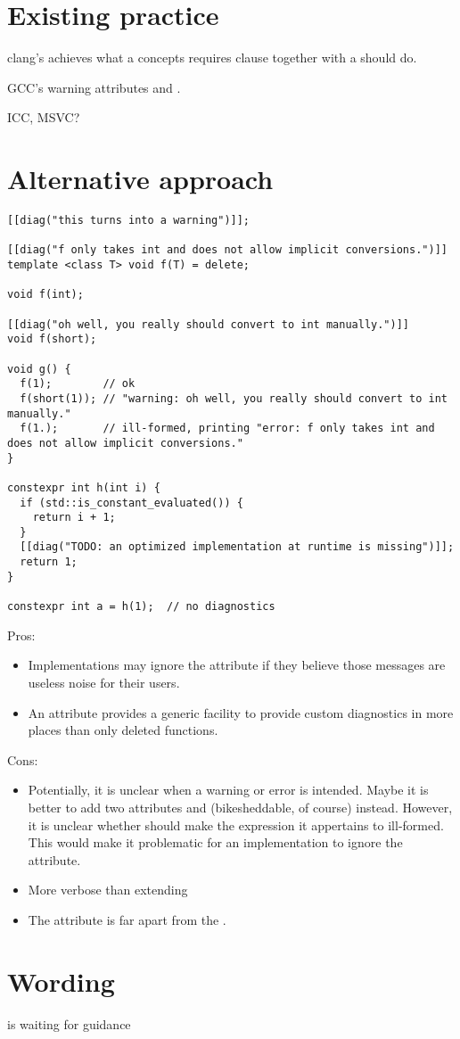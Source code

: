 \section{Existing practice}
clang's  achieves what a concepts requires clause together with a  should do.

GCC's warning attributes and .

ICC, MSVC?


\section{Alternative approach}
\begin{lstlisting}[style=Vc]
[[diag("this turns into a warning")]];

[[diag("f only takes int and does not allow implicit conversions.")]]
template <class T> void f(T) = delete;

void f(int);

[[diag("oh well, you really should convert to int manually.")]]
void f(short);

void g() {
  f(1);        // ok
  f(short(1)); // "warning: oh well, you really should convert to int manually."
  f(1.);       // ill-formed, printing "error: f only takes int and does not allow implicit conversions."
}

constexpr int h(int i) {
  if (std::is_constant_evaluated()) {
    return i + 1;
  }
  [[diag("TODO: an optimized implementation at runtime is missing")]];
  return 1;
}

constexpr int a = h(1);  // no diagnostics
\end{lstlisting}

Pros:
\begin{itemize}
  \item Implementations may ignore the attribute if they believe those messages are useless noise for their users.
  \item An attribute provides a generic facility to provide custom diagnostics in more places than only deleted functions.
\end{itemize}
Cons:
\begin{itemize}
  \item Potentially, it is unclear when a warning or error is intended.
    Maybe it is better to add two attributes  and  (bikesheddable, of course) instead.
    However, it is unclear whether  should make the expression it appertains to ill-formed.
    This would make it problematic for an implementation to ignore the attribute.
  \item More verbose than extending 
  \item The attribute is far apart from the .
\end{itemize}

\section{Wording}
is waiting for guidance


